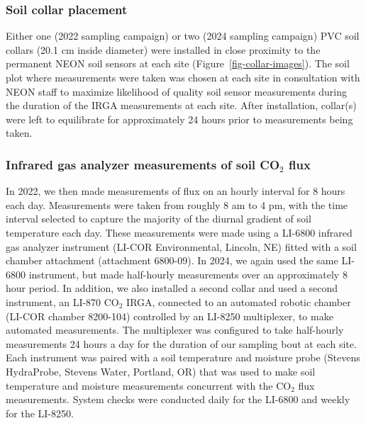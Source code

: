 \documentclass[
  letterpaper,
  DIV=11,
  numbers=noendperiod]{scrartcl}
\begin{document}
\subsubsection{Soil collar placement}\label{soil-collar-placement}

Either one (2022 sampling campaign) or two (2024 sampling campaign) PVC
soil collars (20.1 cm inside diameter) were installed in close proximity
to the permanent NEON soil sensors at each site
(Figure~\ref{fig-collar-images}). The soil plot where measurements were
taken was chosen at each site in consultation with NEON staff to
maximize likelihood of quality soil sensor measurements during the
duration of the IRGA measurements at each site. After installation,
collar(s) were left to equilibrate for approximately 24 hours prior to
measurements being taken.

\subsubsection{\texorpdfstring{Infrared gas analyzer measurements of
soil CO\(_{2}\)
flux}{Infrared gas analyzer measurements of soil CO\_\{2\} flux}}\label{infrared-gas-analyzer-measurements-of-soil-co_2-flux}

In 2022, we then made measurements of flux on an hourly interval for 8
hours each day. Measurements were taken from roughly 8 am to 4 pm, with
the time interval selected to capture the majority of the diurnal
gradient of soil temperature each day. These measurements were made
using a LI-6800 infrared gas analyzer instrument (LI-COR Environmental,
Lincoln, NE) fitted with a soil chamber attachment (attachment 6800-09).
In 2024, we again used the same LI-6800 instrument, but made half-hourly
measurements over an approximately 8 hour period. In addition, we also
installed a second collar and used a second instrument, an LI-870
CO\(_{2}\) IRGA, connected to an automated robotic chamber (LI-COR
chamber 8200-104) controlled by an LI-8250 multiplexer, to make
automated measurements. The multiplexer was configured to take
half-hourly measurements 24 hours a day for the duration of our sampling
bout at each site. Each instrument was paired with a soil temperature
and moisture probe (Stevens HydraProbe, Stevens Water, Portland, OR)
that was used to make soil temperature and moisture measurements
concurrent with the CO\(_{2}\) flux measurements. System checks were
conducted daily for the LI-6800 and weekly for the LI-8250.
\end{document}
